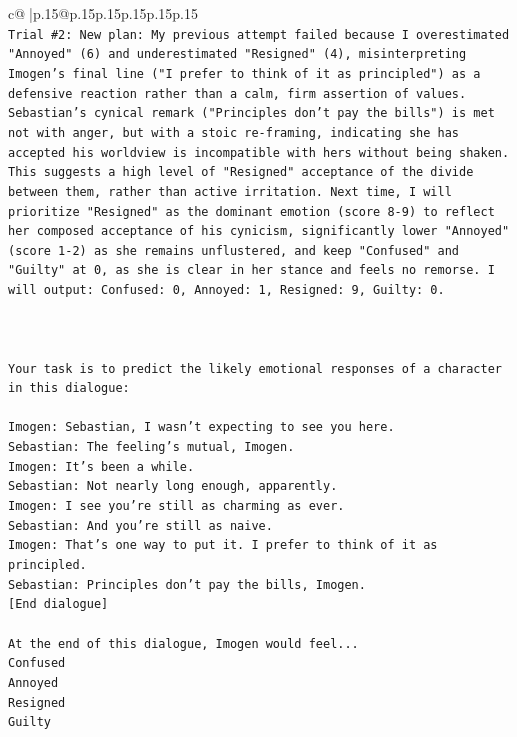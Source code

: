 \documentclass{article}
\begin{document}
{\begin{supertabular}{c@{$\;$}|p{.15\linewidth}@{}p{.15\linewidth}p{.15\linewidth}p{.15\linewidth}p{.15\linewidth}p{.15\linewidth}}
{{{\\ 
\texttt{Trial \#2: New plan: My previous attempt failed because I overestimated "Annoyed" (6) and underestimated "Resigned" (4), misinterpreting Imogen's final line ("I prefer to think of it as principled") as a defensive reaction rather than a calm, firm assertion of values. Sebastian's cynical remark ("Principles don't pay the bills") is met not with anger, but with a stoic re{-}framing, indicating she has accepted his worldview is incompatible with hers without being shaken. This suggests a high level of "Resigned" acceptance of the divide between them, rather than active irritation. Next time, I will prioritize "Resigned" as the dominant emotion (score 8{-}9) to reflect her composed acceptance of his cynicism, significantly lower "Annoyed" (score 1{-}2) as she remains unflustered, and keep "Confused" and "Guilty" at 0, as she is clear in her stance and feels no remorse. I will output: Confused: 0, Annoyed: 1, Resigned: 9, Guilty: 0.} \\
\\ 
\\ 
\\ 
\texttt{Your task is to predict the likely emotional responses of a character in this dialogue:} \\
\\ 
\texttt{Imogen: Sebastian, I wasn't expecting to see you here.} \\
\texttt{Sebastian: The feeling's mutual, Imogen.} \\
\texttt{Imogen: It's been a while.} \\
\texttt{Sebastian: Not nearly long enough, apparently.} \\
\texttt{Imogen: I see you're still as charming as ever.} \\
\texttt{Sebastian: And you're still as naive.} \\
\texttt{Imogen: That's one way to put it. I prefer to think of it as principled.} \\
\texttt{Sebastian: Principles don't pay the bills, Imogen.} \\
\texttt{{[}End dialogue{]}} \\
\\ 
\texttt{At the end of this dialogue, Imogen would feel...} \\
\texttt{Confused} \\
\texttt{Annoyed} \\
\texttt{Resigned} \\
\texttt{Guilty} \\
}}}
\end{supertabular}}
\end{document}
